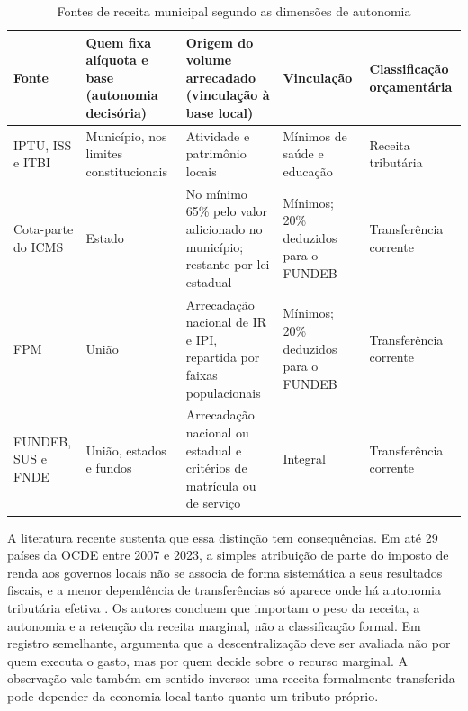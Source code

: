 \begin{table}[H]
\centering\footnotesize\setlength{\tabcolsep}{4pt}
\caption{Fontes de receita municipal segundo as dimensões de autonomia}\label{tab:dimensoes}
\begin{tabularx}{\textwidth}{p{2.6cm} X X p{2.2cm} p{2.3cm}}
\toprule
Fonte & Quem fixa alíquota e base (autonomia decisória) & Origem do volume arrecadado (vinculação à base local) & Vinculação & Classificação orçamentária \\
\midrule
IPTU, ISS e ITBI & Município, nos limites constitucionais & Atividade e patrimônio locais & Mínimos de saúde e educação & Receita tributária \\
Cota-parte do ICMS & Estado & No mínimo 65\% pelo valor adicionado no município; restante por lei estadual & Mínimos; 20\% deduzidos para o FUNDEB & Transferência corrente \\
FPM & União & Arrecadação nacional de IR e IPI, repartida por faixas populacionais & Mínimos; 20\% deduzidos para o FUNDEB & Transferência corrente \\
FUNDEB, SUS e FNDE & União, estados e fundos & Arrecadação nacional ou estadual e critérios de matrícula ou de serviço & Integral & Transferência corrente \\
\bottomrule
\end{tabularx}
\end{table}

A literatura recente sustenta que essa distinção tem consequências. Em até 29 países da OCDE entre 2007 e 2023, a simples atribuição de parte do imposto de renda aos governos locais não se associa de forma sistemática a seus resultados fiscais, e a menor dependência de transferências só aparece onde há autonomia tributária efetiva \citep{Franek2026518}. Os autores concluem que importam o peso da receita, a autonomia e a retenção da receita marginal, não a classificação formal. Em registro semelhante, \citet{Bakri2026} argumenta que a descentralização deve ser avaliada não por quem executa o gasto, mas por quem decide sobre o recurso marginal. A observação vale também em sentido inverso: uma receita formalmente transferida pode depender da economia local tanto quanto um tributo próprio.

